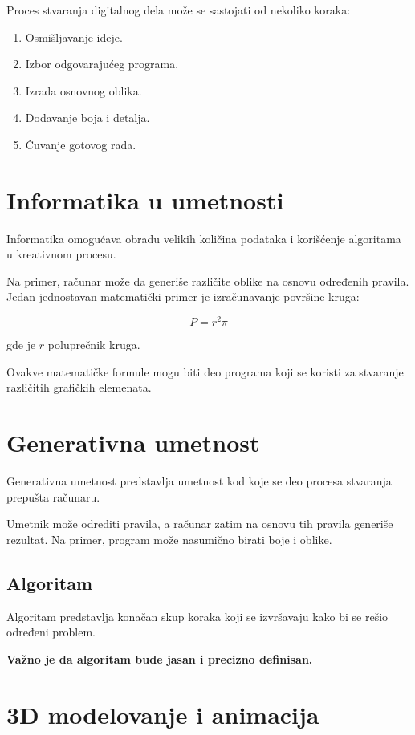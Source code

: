 \documentclass[a4paper,12pt]{article}
\begin{document}
Proces stvaranja digitalnog dela može se sastojati od nekoliko
koraka:

\begin{enumerate}
    \item Osmišljavanje ideje.
    \item Izbor odgovarajućeg programa.
    \item Izrada osnovnog oblika.
    \item Dodavanje boja i detalja.
    \item Čuvanje gotovog rada.
\end{enumerate}

\section{Informatika u umetnosti}

Informatika omogućava obradu velikih količina podataka i
korišćenje algoritama u kreativnom procesu.

Na primer, računar može da generiše različite oblike na osnovu
određenih pravila. Jedan jednostavan matematički primer je
izračunavanje površine kruga:

\[
P = r^2 \pi
\]

gde je $r$ poluprečnik kruga.

Ovakve matematičke formule mogu biti deo programa koji se
koristi za stvaranje različitih grafičkih elemenata.

\section{Generativna umetnost}

Generativna umetnost predstavlja umetnost kod koje se deo
procesa stvaranja prepušta računaru.

Umetnik može odrediti pravila, a računar zatim na osnovu tih
pravila generiše rezultat. Na primer, program može nasumično
birati boje i oblike.

\subsection{Algoritam}

Algoritam predstavlja konačan skup koraka koji se izvršavaju
kako bi se rešio određeni problem.

\textbf{Važno je da algoritam bude jasan i precizno definisan.}

\section{3D modelovanje i animacija}
\end{document}
